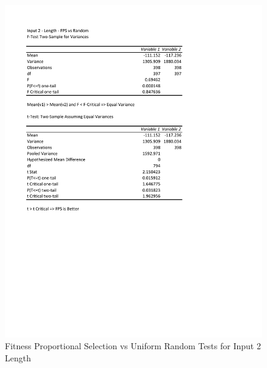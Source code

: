 \documentclass[times]{article}
\begin{document}
	\begin{figure}
		\caption{Fitness Proportional Selection vs Uniform Random Tests for Input 2 Length}
		\label{fig:2parent3}
		\includegraphics[width=\textwidth]{./t_test/2_parent3.pdf}
	\end{figure}
\end{document}
